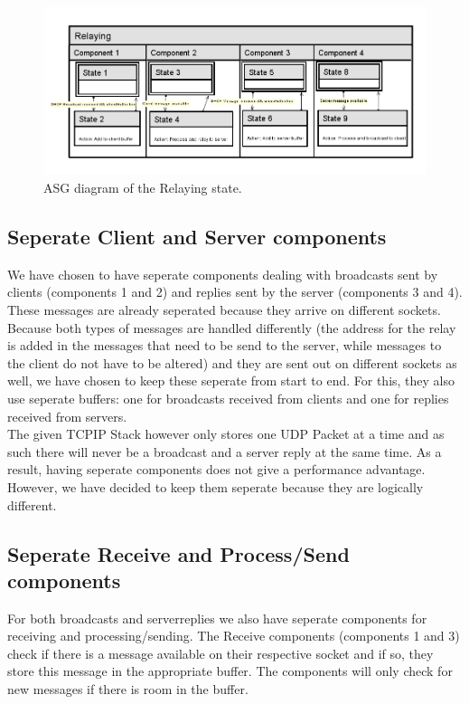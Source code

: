 \documentclass[11pt,a4paper]{scrartcl}
\begin{document}
\begin{figure}
	\centering
	\includegraphics[width=1.0\textwidth]{../img/relaying-asg.png}
	\caption{ASG diagram of the Relaying state.\label{fig:asgRelaying}}
\end{figure}

\subsection{Seperate Client and Server components}
We have chosen to have seperate components dealing with broadcasts sent by clients (components 1 and 2) and replies sent by the server (components 3 and 4). These messages are already seperated because they arrive on different sockets. Because both types of messages are handled differently (the address for the relay is added in the messages that need to be send to the server, while messages to the client do not have to be altered) and they are sent out on different sockets as well, we have chosen to keep these seperate from start to end. For this, they also use seperate buffers: one for broadcasts received from clients and one for replies received from servers.\\
The given TCPIP Stack however only stores one UDP Packet at a time and as such there will never be a broadcast and a server reply at the same time. As a result, having seperate components does not give a performance advantage. However, we have decided to keep them seperate because they are logically different.

\subsection{Seperate Receive and Process/Send components}
For both broadcasts and serverreplies we also have seperate components for receiving and processing/sending. The Receive components (components 1 and 3) check if there is a message available on their respective socket and if so, they store this message in the appropriate buffer. The components will only check for new messages if there is room in the buffer.
\end{document}
